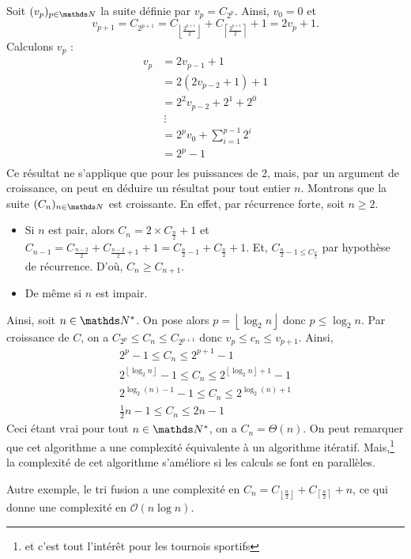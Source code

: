 Soit $(v_p)_{p\in\N}$ la suite définie par $v_p = C_{2^p}$.
Ainsi, $v_0 = 0$ et \[
	v_{p+1} = C_{2^{p+1}} = C_{\left\lfloor \frac{2^{p+1}}{2} \right\rfloor} + C_{\left\lceil \frac{2^{p+1}}{2} \right\rceil} + 1 = 2 v_p + 1
.\]
Calculons $v_p$ :
\begin{align*}
	v_p &= 2 v_{p-1} + 1\\
	&= 2(2v_{p-2} + 1) + 1 \\
	&= 2^2 v_{p-2} + 2^1 + 2^0 \\
	&\:\vdots \\
	&= 2^p v_0 + \sum_{i=1}^{p-1} 2^i \\
	&= 2^p - 1 \\
\end{align*}
Ce résultat ne s'applique que pour les puissances de 2, mais, par un argument de croissance, on peut en déduire un résultat pour tout entier $n$.
Montrons que la suite $(C_n)_{n\in\N}$ est croissante. En effet, par récurrence forte, soit $n \ge 2$.
\begin{itemize}
	\item Si $n$ est pair, alors $C_n = 2 \times C_{\frac{n}{2}} + 1$ et $C_{n-1} = C_{\frac{n-2}{2}} + C_{\frac{n-2}{2} + 1} + 1 = C_{\frac{n}{2} - 1} + C_{\frac{n}{2}} + 1$. Et, $C_{\frac{n}{2} - 1 \le C_{\frac{n}{2}}}$ par hypothèse de récurrence. D'où, $C_n \ge C_{n+1}$.
	\item De même si $n$ est impair.
\end{itemize}
Ainsi, soit $n \in \N^*$. On pose alors $p = \left\lfloor \log_2 n \right\rfloor$ donc $p \le \log_2 n$.
Par croissance de $C$, on a $C_{2^p} \le C_n \le C_{2^{p+1}}$ donc $v_p \le c_n \le v_{p+1}$.
Ainsi,
\begin{gather*}
	2^p - 1 \le C_n \le 2^{p+1} - 1\\
	2^{\left\lfloor \log_2 n \right\rfloor} - 1 \le C_n \le 2^{\left\lfloor \log_2 n \right\rfloor + 1} - 1\\
	2^{\log_2(n) - 1} - 1 \le C_n \le 2^{\log_2(n) + 1}\\
	\frac{1}{2} n - 1 \le C_n \le 2n - 1
\end{gather*}
Ceci étant vrai pour tout $n \in \N^*$, on a $C_n = \Theta(n)$.
On peut remarquer que cet algorithme a une complexité équivalente à un algorithme itératif.
Mais,\footnote{et c'est tout l'intérêt pour les tournois sportifs} la complexité de cet algorithme s'améliore si les calculs se font en parallèles.

Autre exemple, le tri fusion a une complexité en $C_n = C_{\left\lfloor \frac{n}{2} \right\rfloor} + C_{\left\lceil \frac{n}{2} \right\rceil} + n$, ce qui donne une complexité en $\mathcal{O}(n \log n)$.
